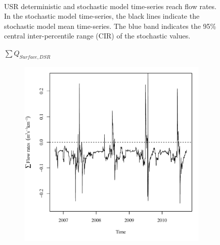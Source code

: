 \begin{landscape}
\begin{figure}
\begin{subfigure}{0.7\textwidth}
		\end{subfigure}\\
		\caption[USR deterministic and stochastic model time-series reach flow rates.]{USR deterministic and stochastic model time-series reach flow rates.  In the stochastic model time-series, the black lines indicate the stochastic model mean time-series.  The blue band indicates the 95\% central inter-percentile range (CIR) of the stochastic values.}
		\label{fig:reachFlow_US}
	\end{figure}
\end{landscape}
\subfiguretop
\begin{landscape}
	\begin{figure}
		\centering
		$ \displaystyle \sum Q_{Surface,DSR} $
		\begin{subfigure}{0.7\textwidth}
			\centering
			\includegraphics[width=\tableCustomSize]{"Figures/Results_DSR/Deterministic/Balance Water - flow"}
		\end{subfigure}%
		\begin{subfigure}{0.7\textwidth}
			\centering

\end{subfigure}
\end{figure}
\end{landscape}
